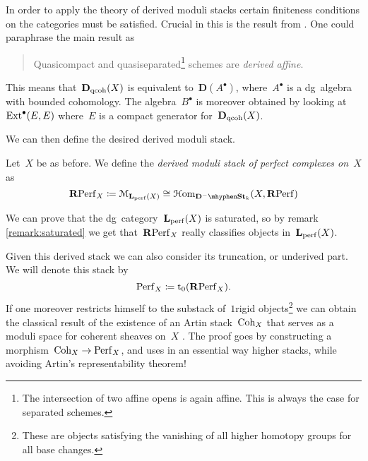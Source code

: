 \begin{refsection}
In order to apply the theory of derived moduli stacks certain finiteness conditions on the categories must be satisfied. Crucial in this is the result from \cite{bondal-vandenbergh-generators-and-representability}. One could paraphrase the main result as
\begin{quote}
  Quasicompact and quasiseparated\footnote{The intersection of two affine opens is again affine. This is always the case for separated schemes.} schemes are \emph{derived affine}.
\end{quote}
\begin{flushright}
  \cite[corollary 3.1.8]{bondal-vandenbergh-generators-and-representability}
\end{flushright}
This means that~$\mathbf{D}_{\mathrm{qcoh}}(X)$ is equivalent to~$\mathbf{D}(A^\bullet)$, where~$A^\bullet$ is a dg~algebra with bounded cohomology. The algebra~$B^\bullet$ is moreover obtained by looking at~$\mathrm{Ext}^\bullet(E,E)$ where~$E$ is a compact generator for~$\mathbf{D}_{\mathrm{qcoh}}(X)$.

We can then define the desired derived moduli stack.
\begin{definition}
  Let~$X$ be as before. We define the \emph{derived moduli stack of perfect complexes on~$X$} as
  \begin{equation}
    \RPerf_X\coloneqq\mathcal{M}_{\LLL_\perf(X)}\cong\HHom_{\mathbf{D}^-\mhyphen\St_k}(X,\RPerf)
  \end{equation}
\end{definition}

\begin{remark}
  We can prove that the dg~category~$\mathbf{L}_{\mathrm{perf}}(X)$ is saturated, so by remark \ref{remark:saturated} we get that~$\mathbf{R}\mathrm{Perf}_X$ really classifies objects in~$\mathbf{L}_{\mathrm{perf}}(X)$.
\end{remark}

\begin{remark}
  Given this derived stack we can also consider its truncation, or underived part. We will denote this stack by
  \begin{equation}
    \mathrm{Perf}_X\coloneqq\mathrm{t}_0(\mathbf{R}\mathrm{Perf}_X).
  \end{equation}
  If one moreover restricts himself to the substack of~$1$\dash rigid objects\footnote{These are objects satisfying the vanishing of all higher homotopy groups for all base changes.} we can obtain the classical result of the existence of an Artin stack~$\mathrm{Coh}_X$ that serves as a moduli space for coherent sheaves on~$X$ \cite[th\'eor\`eme 4.6.2.1]{laumon-moret-bailly-champs-algebriques} \cite[tag 08KA]{stacks-project}. The proof goes by constructing a morphism~$\mathrm{Coh}_X\to\mathrm{Perf}_X$, and uses in an essential way higher stacks, while avoiding Artin's representability theorem!
\end{remark}



\printbibliography[heading = local]

\end{refsection}
